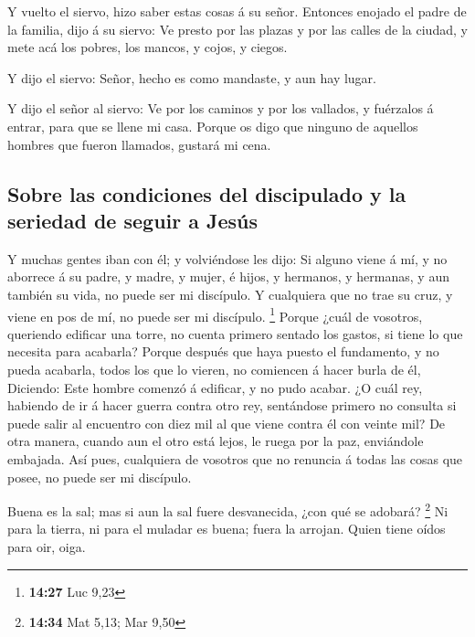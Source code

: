  Y vuelto el siervo, hizo saber estas cosas á su señor.
Entonces enojado el padre de la familia, dijo á su siervo: Ve presto por
las plazas y por las calles de la ciudad, y mete acá los pobres, los
mancos, y cojos, y ciegos.

 Y dijo el siervo: Señor, hecho es como mandaste, y aun
hay lugar.

 Y dijo el señor al siervo: Ve por los caminos y por los
vallados, y fuérzalos á entrar, para que se llene mi casa.
 Porque os digo que ninguno de aquellos hombres que
fueron llamados, gustará mi cena.

\hypertarget{sobre-las-condiciones-del-discipulado-y-la-seriedad-de-seguir-a-jesuxfas}{%
\subsection{Sobre las condiciones del discipulado y la seriedad de
seguir a
Jesús}\label{sobre-las-condiciones-del-discipulado-y-la-seriedad-de-seguir-a-jesuxfas}}

 Y muchas gentes iban con él; y volviéndose les dijo:
 Si alguno viene á mí, y no aborrece á su padre, y madre,
y mujer, é hijos, y hermanos, y hermanas, y aun también su vida, no
puede ser mi discípulo.  Y cualquiera que no trae su
cruz, y viene en pos de mí, no puede ser mi discípulo. \footnote{\textbf{14:27}
  Luc 9,23}  Porque ¿cuál de vosotros, queriendo edificar
una torre, no cuenta primero sentado los gastos, si tiene lo que
necesita para acabarla?  Porque después que haya puesto
el fundamento, y no pueda acabarla, todos los que lo vieren, no
comiencen á hacer burla de él,  Diciendo: Este hombre
comenzó á edificar, y no pudo acabar.  ¿O cuál rey,
habiendo de ir á hacer guerra contra otro rey, sentándose primero no
consulta si puede salir al encuentro con diez mil al que viene contra él
con veinte mil?  De otra manera, cuando aun el otro está
lejos, le ruega por la paz, enviándole embajada.  Así
pues, cualquiera de vosotros que no renuncia á todas las cosas que
posee, no puede ser mi discípulo.

 Buena es la sal; mas si aun la sal fuere desvanecida,
¿con qué se adobará? \footnote{\textbf{14:34} Mat 5,13; Mar 9,50}
 Ni para la tierra, ni para el muladar es buena; fuera la
arrojan. Quien tiene oídos para oir, oiga.

